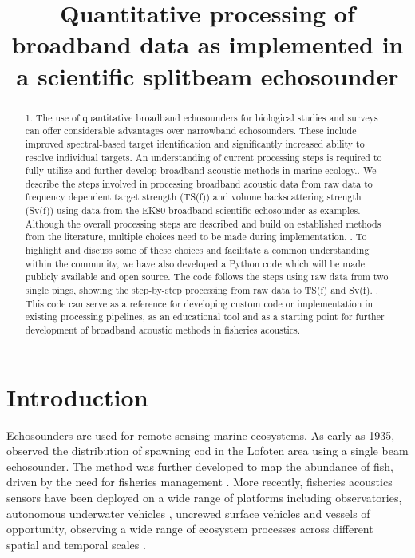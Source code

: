 \documentclass[preprint,12pt,TurnOnLineNumbers]{JASAnew}
\begin{document}
\title[]{Quantitative processing of broadband data as implemented in a scientific splitbeam echosounder}

\begin{abstract}
1. The use of quantitative broadband echosounders for biological studies and surveys can offer considerable advantages over narrowband echosounders. These include improved spectral-based target identification and significantly increased ability to resolve individual targets. An understanding of current processing steps is required to fully utilize and further develop broadband acoustic methods in marine ecology.. We describe the steps involved in processing broadband acoustic data from raw data to frequency dependent target strength (TS(f)) and volume backscattering strength (Sv(f)) using data from the EK80 broadband scientific echosounder as examples. Although the overall processing steps are described and build on established methods from the literature, multiple choices need to be made during implementation. . To highlight and discuss some of these choices and facilitate a common understanding within the community, we have also developed a Python code which will be made publicly available and open source. The code follows the steps using raw data from two single pings, showing the step-by-step processing from raw data to TS(f) and Sv(f). . This code can serve as a reference for developing custom code or implementation in existing processing pipelines, as an educational tool and as a starting point for further development of broadband acoustic methods in fisheries acoustics.\linebreak

\end{abstract}

\maketitle


\section{Introduction}

Echosounders are used for remote sensing marine ecosystems. As early as 1935, \citet{sund_echo_1935} observed the distribution of spawning cod in the Lofoten area using a single beam echosounder. The method was further developed to map the abundance of fish, driven by the need for fisheries management \citep{Simmonds2005Fisheries}. More recently, fisheries acoustics sensors have been deployed on a wide range of platforms including observatories, autonomous underwater vehicles \citep{fernandes_autonomous_2003}, uncrewed surface vehicles \citep{de_robertis_uncrewed_2021} and vessels of opportunity, observing a wide range of ecosystem processes across different spatial and temporal scales \citep{godo_marine_2014}.
\end{document}
